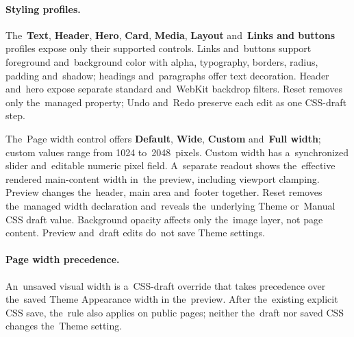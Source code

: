 \documentclass[11pt,a4paper]{article}
\newcommand{\ui}[1]{\textbf{#1}}
\begin{document}
\paragraph{Styling profiles.} The~\ui{Text}, \ui{Header}, \ui{Hero}, \ui{Card},
\ui{Media}, \ui{Layout} and~\ui{Links and buttons} profiles expose only their
supported controls. Links and~buttons support foreground and~background color
with alpha, typography, borders, radius, padding and~shadow; headings
and~paragraphs offer text decoration. Header and~hero expose separate standard
and~WebKit backdrop filters. Reset removes only the~managed property; Undo
and~Redo preserve each edit as one CSS-draft step.

The~Page width control offers \ui{Default}, \ui{Wide}, \ui{Custom} and~\ui{Full
width}; custom values range from 1024 to~2048~pixels. Custom width has
a~synchronized slider and~editable numeric pixel field. A~separate readout shows
the~effective rendered main-content width in~the preview, including viewport
clamping. Preview changes the~header, main area and~footer together. Reset
removes the~managed width declaration and~reveals the~underlying Theme or~Manual
CSS draft value. Background opacity affects only the~image layer, not page
content. Preview and~draft edits do~not save Theme settings.
\paragraph{Page width precedence.} An~unsaved visual width is a~CSS-draft
override that takes precedence over the~saved Theme Appearance width in
the~preview. After the~existing explicit CSS save, the~rule also applies on
public pages; neither the~draft nor saved CSS changes the~Theme setting.
\end{document}
